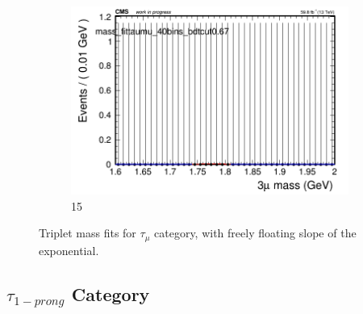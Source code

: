 \begin{figure}[h!]
\begin{subfigure}{0.2\textwidth}
        \includegraphics[width=\textwidth]{unfixed_exp/plots/taumu/massfit_taumu_40bins_bdtcut0.67.png}
        \caption{15}
    \end{subfigure}
    \caption{Triplet mass fits for $\tau_{\mu}$ category, with freely floating slope of the exponential.}
    \label{fig:unfixed_taumu}
\end{figure}


\newpage

\subsection{$\tau_{1-prong}$ Category}
\label{sec:tauha}

